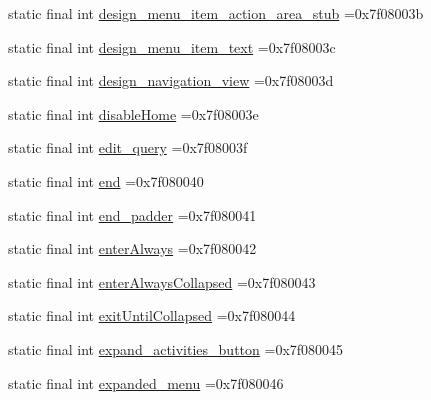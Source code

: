 \begin{DoxyCompactItemize}
static final int \mbox{\hyperlink{classbr_1_1unb_1_1cic_1_1mp_1_1marketmaster_1_1test_1_1R_1_1id_a8f352fa3ed9cfa4295a0c0bd1b65edb8}{design\+\_\+menu\+\_\+item\+\_\+action\+\_\+area\+\_\+stub}} =0x7f08003b
\item 
static final int \mbox{\hyperlink{classbr_1_1unb_1_1cic_1_1mp_1_1marketmaster_1_1test_1_1R_1_1id_a78923b6ed9a34182bd348e9c7f9fe810}{design\+\_\+menu\+\_\+item\+\_\+text}} =0x7f08003c
\item 
static final int \mbox{\hyperlink{classbr_1_1unb_1_1cic_1_1mp_1_1marketmaster_1_1test_1_1R_1_1id_a9646c238cd60546b1ff730dcbb731759}{design\+\_\+navigation\+\_\+view}} =0x7f08003d
\item 
static final int \mbox{\hyperlink{classbr_1_1unb_1_1cic_1_1mp_1_1marketmaster_1_1test_1_1R_1_1id_a4143c21d722545e6ebc34a9ee4634f1b}{disable\+Home}} =0x7f08003e
\item 
static final int \mbox{\hyperlink{classbr_1_1unb_1_1cic_1_1mp_1_1marketmaster_1_1test_1_1R_1_1id_a752773f79a2eea5f5c5201d3a4ed9cee}{edit\+\_\+query}} =0x7f08003f
\item 
static final int \mbox{\hyperlink{classbr_1_1unb_1_1cic_1_1mp_1_1marketmaster_1_1test_1_1R_1_1id_a476695ca2abaa1bac6799ef4192dd5dc}{end}} =0x7f080040
\item 
static final int \mbox{\hyperlink{classbr_1_1unb_1_1cic_1_1mp_1_1marketmaster_1_1test_1_1R_1_1id_a3b85501fae758fa5fb72fcc610824a7b}{end\+\_\+padder}} =0x7f080041
\item 
static final int \mbox{\hyperlink{classbr_1_1unb_1_1cic_1_1mp_1_1marketmaster_1_1test_1_1R_1_1id_a098c501a1e4bb116f493450393d17ef9}{enter\+Always}} =0x7f080042
\item 
static final int \mbox{\hyperlink{classbr_1_1unb_1_1cic_1_1mp_1_1marketmaster_1_1test_1_1R_1_1id_a4b55350a981fd7c74625d5efe7bae58a}{enter\+Always\+Collapsed}} =0x7f080043
\item 
static final int \mbox{\hyperlink{classbr_1_1unb_1_1cic_1_1mp_1_1marketmaster_1_1test_1_1R_1_1id_a6ef213b0b6054070310c8b08dd6c2480}{exit\+Until\+Collapsed}} =0x7f080044
\item 
static final int \mbox{\hyperlink{classbr_1_1unb_1_1cic_1_1mp_1_1marketmaster_1_1test_1_1R_1_1id_ab3a4d221fb6d11fe3bf9d4d28db36af2}{expand\+\_\+activities\+\_\+button}} =0x7f080045
\item 
static final int \mbox{\hyperlink{classbr_1_1unb_1_1cic_1_1mp_1_1marketmaster_1_1test_1_1R_1_1id_ac8d84bda52c9441acb9eac4ae9614058}{expanded\+\_\+menu}} =0x7f080046
\item 

\end{DoxyCompactItemize}

